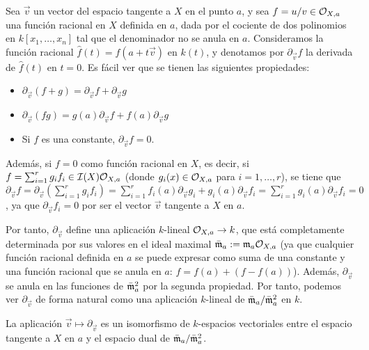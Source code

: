 \documentclass[ACGA.tex]{subfiles}
\begin{document}
Sea $\overrightarrow v$ un vector del espacio tangente a $X$ en el punto $a$, y sea $f=u/v\in{\cal O}_{X,a}$ una función racional en $X$ definida en $a$, dada por el cociente de dos polinomios en $k[x_1,\ldots,x_n]$ tal que el denominador no se anula en $a$. Consideramos la función racional $\hat f(t)=f(a+t\overrightarrow v)$ en $k(t)$, y denotamos por $\partial_{\overrightarrow v}f$ la derivada de $\hat f(t)$ en $t=0$. Es fácil ver que se tienen las siguientes propiedades:
\begin{itemize}
 \item $\partial_{\overrightarrow v}(f+g)=\partial_{\overrightarrow v}f+\partial_{\overrightarrow v}g$
\item $\partial_{\overrightarrow v}(fg)=g(a)\partial_{\overrightarrow v}f+f(a)\partial_{\overrightarrow v}g$
\item Si $f$ es una constante, $\partial_{\overrightarrow v}f=0$.
\end{itemize}

Además, si $f=0$ como función racional en $X$, es decir, si $f=\sum_{i=1}^r g_i f_i\in\mathcal{I}(X){\cal O}_{X,a}$ (donde $g_i(x)\in{\cal O}_{X,a}$ para $i=1,\ldots,r$), se tiene que $\partial_{\overrightarrow v}f=\partial_{\overrightarrow v}(\sum_{i=1}^r g_if_i)=\sum_{i=1}^r f_i(a)\partial_{\overrightarrow v}g_i+g_i(a)\partial_{\overrightarrow v}f_i=\sum_{i=1}^r g_i(a)\partial_{\overrightarrow v}f_i=0$, ya que $\partial_{\overrightarrow v}f_i=0$ por ser el vector $\overrightarrow v$ tangente a $X$ en $a$.

Por tanto, $\partial_{\overrightarrow v}$ define una aplicación $k$-lineal ${\cal O}_{X,a}\to k$, que está completamente determinada por sus valores en el ideal maximal $\bar{{\mathfrak{m}}}_a:={\mathfrak{m}}_a{\cal O}_{X,a}$ (ya que cualquier función racional definida en $a$ se puede expresar como suma de una constante y una función racional que se anula en $a$: $f=f(a)+(f-f(a))$). Además, $\partial_{\overrightarrow v}$ se anula en las funciones de $\bar{{\mathfrak{m}}}_a^2$ por la segunda propiedad. Por tanto, podemos ver $\partial_{\overrightarrow v}$ de forma natural como una aplicación $k$-lineal de $\bar{{\mathfrak{m}}}_a/\bar{{\mathfrak{m}}}_a^2$ en $k$. 	

\begin{prop}
 La aplicación $\overrightarrow v \mapsto\partial_{\overrightarrow v}$ es un isomorfismo de $k$-espacios vectoriales entre el espacio tangente a $X$ en $a$ y el espacio dual de $\bar{{\mathfrak{m}}}_a/\bar{{\mathfrak{m}}}_a^2$.
\end{prop}
\end{document}
